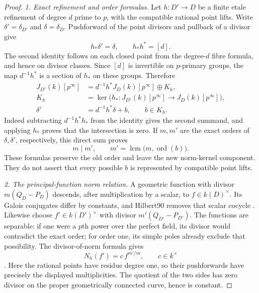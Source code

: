 \begin{proof}
\emph{1. Exact refinement and order formulas.}
Let $h:D'\to D$ be a finite etale refinement of degree $d$
prime to $p$, with the compatible rational point lifts.
Write $\delta'=\delta_{D'}$ and $\delta=\delta_D$.
Pushforward of the point divisors and pullback of a divisor
give
\[
                     h_*\delta'=\delta,
                     \qquad h_*h^*=[d].
       \tag{NC.2}
\]
The second identity follows on each closed point from the
degree-$d$ fibre formula, and hence on divisor classes.
Since $[d]$ is invertible on $p$-primary groups, the map
$d^{-1}h^*$ is a section of $h_*$ on these groups. Therefore
\[
\begin{aligned}
 J_{D'}(k)[p^\infty]
   &=d^{-1}h^*J_D(k)[p^\infty]\oplus K_h,\\
 K_h&=\ker\bigl(h_*:J_{D'}(k)[p^\infty]
                         \longrightarrow J_D(k)[p^\infty]\bigr),\\
 \delta'&=d^{-1}h^*\delta+b,\qquad b\in K_h.
\end{aligned}
       \tag{NC.3}
\]
Indeed subtracting $d^{-1}h^*h_*$ from the identity gives
the second summand, and applying $h_*$ proves that the
intersection is zero. If $m,m'$ are the exact orders of
$\delta,\delta'$, respectively, this direct sum proves
\[
           m\mid m',\qquad
           m'=\operatorname{lcm}\bigl(m,\operatorname{ord}(b)\bigr).
       \tag{NC.4}
\]
These formulas preserve the old order and leave the new
norm-kernel component. They do not assert that every possible
$b$ is represented by compatible point lifts.

\emph{2. The principal-function norm relation.}
A geometric function with divisor $m(Q_D-P_D)$ descends,
after multiplication by a scalar, to $f\in k(D)^\times$.
Its Galois conjugates differ by constants, and Hilbert90
removes that scalar cocycle
\cite[Theorem~59.24.1, Tag~\texttt{03P8}]{Stacks03P8}.
Likewise choose $f'\in k(D')^\times$ with divisor
$m'(Q_{D'}-P_{D'})$.
The functions are separable: if one were a $p$th power over
the perfect field, its divisor would contradict the exact
order; for order one, its simple poles already exclude that
possibility. The divisor-of-norm formula gives
\[
                 N_h(f')=c\,f^{m'/m},\qquad c\in k^\times
       \tag{NC.5}
\]
\cite[Lemma~42.18.1, Tag~\texttt{02RT}]{Stacks02RT}.
Here the rational points have residue degree one, so their
pushforwards have precisely the displayed multiplicities.
The quotient of the two sides has zero divisor on the
proper geometrically connected curve, hence is constant.


\end{proof}
